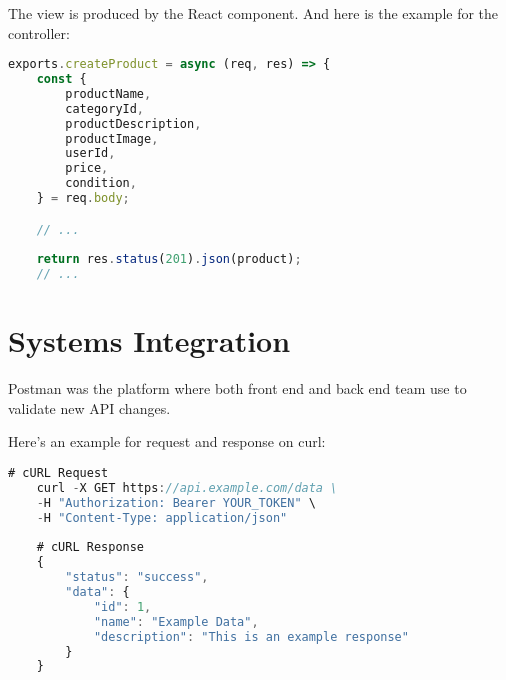 The view is produced by the React component. And here is the example for the controller:

\begin{lstlisting}[language=JavaScript, caption={Controller setup example}]
exports.createProduct = async (req, res) => {
	const {
		productName,
		categoryId,
		productDescription,
		productImage,
		userId,
		price,
		condition,
	} = req.body;

	// ...
	
	return res.status(201).json(product);
	// ...
\end{lstlisting}

\section{Systems Integration}

Postman was the platform where both front end and back end team use to validate new API changes.

Here's an example for request and response on curl:


\begin{lstlisting}[label=curl, language=JavaScript, caption={curl reponse example}]
	# cURL Request
	curl -X GET https://api.example.com/data \
	-H "Authorization: Bearer YOUR_TOKEN" \
	-H "Content-Type: application/json"
	
	# cURL Response
	{
		"status": "success",
		"data": {
			"id": 1,
			"name": "Example Data",
			"description": "This is an example response"
		}
	}
\end{lstlisting}

\clearpage